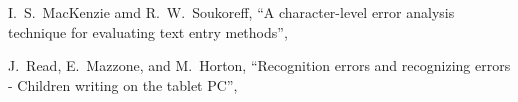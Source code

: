 \documentclass[uplatex, twocolumn,10pt]{jsarticle}
\begin{document}
\begin{thebibliography}{99}
    I.~S.~MacKenzie amd R.~W.~Soukoreff,
    \newblock “A character-level error analysis technique for evaluating text entry methods”,
    
    J.~Read, E.~Mazzone, and M.~Horton,
    \newblock “Recognition errors and recognizing errors - Children writing on the tablet PC”,
    
\end{thebibliography}
\end{document}
